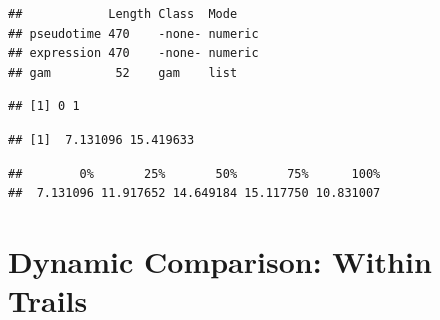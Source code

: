 \documentclass[]{book}
\newenvironment{Shaded}{\begin{snugshade}}{\end{snugshade}}
\newcommand{\KeywordTok}[1]{\textcolor[rgb]{0.13,0.29,0.53}{\textbf{#1}}}
\newcommand{\DataTypeTok}[1]{\textcolor[rgb]{0.13,0.29,0.53}{#1}}
\newcommand{\DecValTok}[1]{\textcolor[rgb]{0.00,0.00,0.81}{#1}}
\newcommand{\StringTok}[1]{\textcolor[rgb]{0.31,0.60,0.02}{#1}}
\newcommand{\CommentTok}[1]{\textcolor[rgb]{0.56,0.35,0.01}{\textit{#1}}}
\newcommand{\OperatorTok}[1]{\textcolor[rgb]{0.81,0.36,0.00}{\textbf{#1}}}
\newcommand{\NormalTok}[1]{#1}
\theoremstyle{definition}
\theoremstyle{definition}
\theoremstyle{definition}
\theoremstyle{remark}
\begin{document}
\begin{verbatim}
##            Length Class  Mode   
## pseudotime 470    -none- numeric
## expression 470    -none- numeric
## gam         52    gam    list
\end{verbatim}

\begin{Shaded}
\end{Shaded}

\begin{verbatim}
## [1] 0 1
\end{verbatim}

\begin{Shaded}
\end{Shaded}

\begin{verbatim}
## [1]  7.131096 15.419633
\end{verbatim}

\begin{Shaded}
\end{Shaded}

\begin{verbatim}
##        0%       25%       50%       75%      100% 
##  7.131096 11.917652 14.649184 15.117750 10.831007
\end{verbatim}

\section{Dynamic Comparison: Within
Trails}\label{dynamic-comparison-within-trails}
\end{document}
